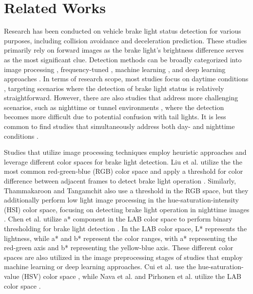 \section{Related Works}
\label{sec:related}

Research has been conducted on vehicle brake light status detection for various purposes, including collision avoidance and deceleration prediction.
These studies primarily rely on forward images as the brake light's brightness difference serves as the most significant clue. 
Detection methods can be broadly categorized into image processing \cite{thammakaroon2009predictive, chen2015daytime, liu2015vision}, frequency-tuned \cite{chen2012frequency}, machine learning \cite{cui2015vision, nava2019collision, pirhonen2022brake}, and deep learning approaches \cite{wang2016appearance, li2020highly, kim2022detecting}.
In terms of research scope, most studies focus on daytime conditions \cite{liu2015vision,chen2015daytime,cui2015vision,wang2016appearance,nava2019collision,pirhonen2022brake}, targeting scenarios where the detection of brake light status is relatively straightforward. 
However, there are also studies that address more challenging scenarios, such as nighttime \cite{thammakaroon2009predictive,chen2012frequency} or tunnel environments \cite{kim2022detecting}, where the detection becomes more difficult due to potential confusion with tail lights.
It is less common to find studies that simultaneously address both day- and nighttime conditions \cite{li2020highly}.

Studies that utilize image processing techniques employ heuristic approaches and leverage different color spaces for brake light detection.
Liu et al. utilize the the most common red-green-blue (RGB) color space and apply a threshold for color difference between adjacent frames to detect brake light operation \cite{liu2015vision}.
Similarly, Thammakaroon and Tangamchit also use a threshold in the RGB space, but they additionally perform low light image processing in the hue-saturation-intensity (HSI) color space, focusing on detecting brake light operation in nighttime images \cite{thammakaroon2009predictive}.
Chen et al. utilize a* component in the LAB color space to perform binary thresholding for brake light detection \cite{chen2015daytime}.
In the LAB color space, L* represents the lightness, while a* and b* represent the color ranges, with a* representing the red-green axis and b* representing the yellow-blue axis.
These different color spaces are also utilized in the image preprocessing stages of studies that employ machine learning or deep learning approaches.
Cui et al. use the hue-saturation-value (HSV) color space \cite{cui2015vision}, while Nava et al. and Pirhonen et al. utilize the LAB color space \cite{nava2019collision, pirhonen2022brake}.

